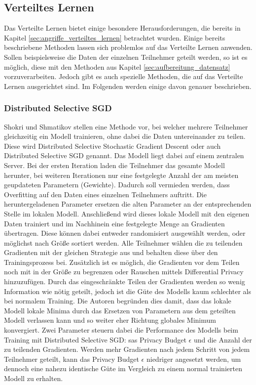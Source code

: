 \subsection{Verteiltes Lernen}\label{sec:verteiltes_lernen}

Das Verteilte Lernen bietet einige besondere Herausforderungen, die bereits in Kapitel \ref{sec:angriffe_verteiltes_lernen} betrachtet wurden. 
Einige bereits beschriebene Methoden lassen sich problemlos auf das Verteilte Lernen anwenden.
Sollen beispielsweise die Daten der einzelnen Teilnehmer geteilt werden, so ist es möglich, diese mit den Methoden aus Kapitel \ref{sec:aufbereitung_datensatz} vorzuverarbeiten.
Jedoch gibt es auch spezielle Methoden, die auf das Verteilte Lernen ausgerichtet sind.
Im Folgenden werden einige davon genauer beschrieben.

\subsubsection*{Distributed Selective SGD}
Shokri und Shmatikov \cite{P-78} stellen eine Methode vor, bei welcher mehrere Teilnehmer gleichzeitig ein Modell trainieren, ohne dabei die Daten untereinander zu teilen.
Diese wird Distributed Selective Stochastic Gradient Descent oder auch Distributed Selective SGD genannt.
Das Modell liegt dabei auf einem zentralen Server.
Bei der ersten Iteration laden die Teilnehmer das gesamte Modell herunter, bei weiteren Iterationen nur eine festgelegte Anzahl der am meisten geupdateten Parametern (Gewichte).
Dadurch soll vermieden werden, dass Overfitting auf den Daten eines einzelnen Teilnehmers auftritt.
Die heruntergeladenen Parameter ersetzen die alten Parameter an der entsprechenden Stelle im lokalen Modell.
Anschließend wird dieses lokale Modell mit den eigenen Daten trainiert und im Nachhinein eine festgelegte Menge an Gradienten übertragen. 
Diese können dabei entweder randomisiert ausgewählt werden, oder möglichst nach Größe sortiert werden.
Alle Teilnehmer wählen die zu teilenden Gradienten mit der gleichen Strategie aus und behalten diese über den Trainingsprozess bei.
Zusätzlich ist es möglich, die Gradienten vor dem Teilen noch mit in der Größe zu begrenzen oder Rauschen mittels Differential Privacy hinzuzufügen.
Durch das eingeschränkte Teilen der Gradienten werden so wenig Information wie nötig geteilt, jedoch ist die Güte des Modells kaum schlechter als bei normalem Training.
Die Autoren begründen dies damit, dass das lokale Modell lokale Minima durch das Ersetzen von Parametern aus dem geteilten Modell verlassen kann und so weiter eher Richtung globales Minimum konvergiert. 
Zwei Parameter steuern dabei die Performance des Modells beim Training mit Distributed Selective SGD: sas Privacy Budget $\epsilon$ und die Anzahl der zu teilenden Gradienten.
Werden mehr Gradienten nach jedem Schritt von jedem Teilnehmer geteilt, kann das Privacy Budget $\epsilon$ niedriger angesetzt werden, um dennoch eine nahezu identische Güte im Vergleich zu einem normal trainierten Modell zu erhalten.

